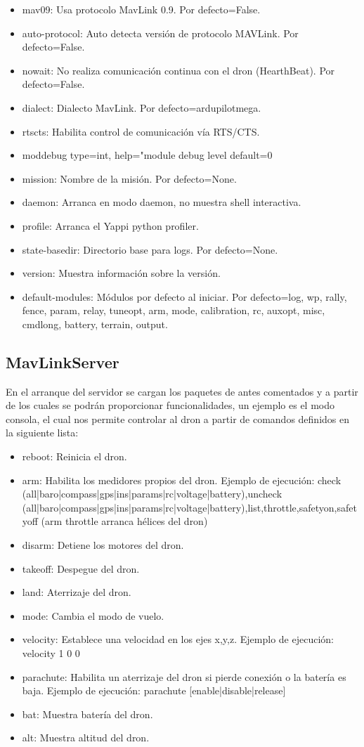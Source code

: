 \begin{multicols}{2}
\begin{itemize}
\item mav09: Usa protocolo MavLink 0.9. Por defecto=False.
\item auto-protocol: Auto detecta versión de protocolo MAVLink. Por defecto=False.
\item nowait: No realiza comunicación continua con el dron (HearthBeat). Por defecto=False.
\item dialect: Dialecto MavLink. Por defecto=ardupilotmega.
\item rtscts: Habilita control de comunicación vía RTS/CTS.
\item moddebug  type=int, help="module debug level default=0
\item mission: Nombre de la misión. Por defecto=None.
\item daemon: Arranca en modo daemon, no muestra shell interactiva.
\item profile: Arranca el Yappi python profiler.
\item state-basedir: Directorio base para logs. Por defecto=None.
\item version: Muestra información sobre la versión.
\item default-modules: Módulos por defecto al iniciar. Por defecto=log, wp, rally, fence, param, relay, tuneopt, arm, mode, calibration, rc, auxopt, misc, cmdlong, battery, terrain, output.
\end{itemize}
\end{multicols}

\subsection{MavLinkServer}
En el arranque del servidor se cargan los paquetes de antes comentados y a partir de los cuales se podrán proporcionar funcionalidades, un ejemplo es el modo consola, el cual nos permite controlar al dron a partir de comandos definidos en la siguiente lista:


\begin{itemize}
\label{comandos}
\item reboot: Reinicia el dron.
\item arm: Habilita los medidores propios del dron. Ejemplo de ejecución: check (all|baro|compass|gps|ins|params|rc|voltage|battery),uncheck (all|baro|compass|gps|ins|params|rc|voltage|battery),list,throttle,safetyon,safetyoff (arm throttle arranca hélices del dron)
\item disarm: Detiene los motores del dron.
\item takeoff: Despegue del dron.
\item land: Aterrizaje del dron.
\item mode: Cambia el modo de vuelo.
\item velocity: Establece una velocidad en los ejes x,y,z. Ejemplo de ejecución: velocity 1 0 0
\item parachute: Habilita un aterrizaje del dron si pierde conexión o la batería es baja. Ejemplo de ejecución: parachute [enable|disable|release]
\item bat: Muestra batería del dron.
\item alt: Muestra altitud del dron.
\end{itemize}

